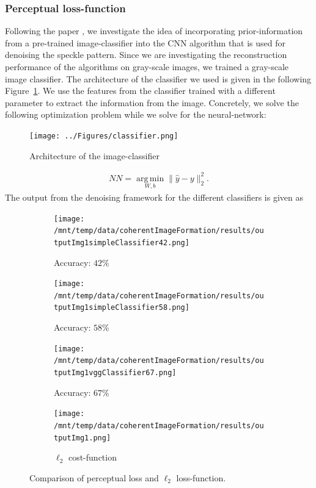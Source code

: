 \documentclass[a4paper, 11pt]{article}
\DeclareMathOperator*{\argmin}{arg\,min}
\begin{document}
\subsubsection{Perceptual loss-function}
Following the paper \cite{SRNET}, we investigate the idea of incorporating prior-information from a pre-trained image-classifier into the CNN algorithm that is used for denoising the speckle pattern. Since we are investigating the reconstruction performance of the algorithms on gray-scale images, we trained a gray-scale image classifier. The architecture of the classifier we used is given in the following Figure~\ref{fig:ArchClassifier}. We use the features from the classifier trained with a different parameter to extract the information from the image. Concretely, we solve the following optimization problem while we solve for the neural-network:
\begin{figure}[!h]
\centering
 \texttt{[image: ../Figures/classifier.png]}
\caption{Architecture of the image-classifier}
\label{fig:ArchClassifier}
\end{figure}
\begin{eqnarray*} 
NN=\underset{W,b}{\argmin}\|\hat{y}-y\|_2^2. 
\end{eqnarray*}
The output from the denoising framework for the different classifiers is given as 
 \begin{figure}[h]
\centering
\begin{subfigure}[b]{0.22\textwidth}
        \texttt{[image: /mnt/temp/data/coherentImageFormation/results/outputImg1simpleClassifier42.png]}
        \caption{Accuracy: $42\%$}
    \end{subfigure}
    \begin{subfigure}[b]{0.22\textwidth}
        \texttt{[image: /mnt/temp/data/coherentImageFormation/results/outputImg1simpleClassifier58.png]}
        \caption{Accuracy: $58\%$}
    \end{subfigure}
    \begin{subfigure}[b]{0.22\textwidth}
        \texttt{[image: /mnt/temp/data/coherentImageFormation/results/outputImg1vggClassifier67.png]}
        \caption{Accuracy: $67\%$}
    \end{subfigure}
    \begin{subfigure}[b]{0.22\textwidth}
        \texttt{[image: /mnt/temp/data/coherentImageFormation/results/outputImg1.png]}
        \caption{$\ell_2$ cost-function}
    \end{subfigure}
\caption{Comparison of perceptual loss and $\ell_2$ loss-function.}
\end{figure}
\end{document}
